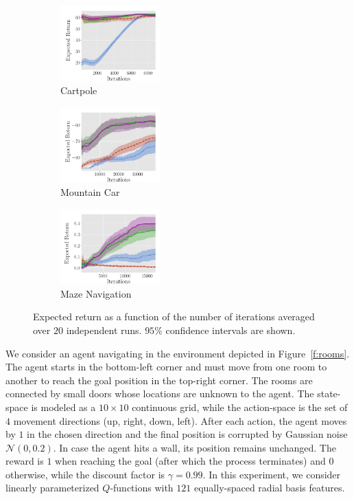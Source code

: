 \documentclass{article}
\begin{document}
\begin{figure}[t]
	\begin{subfigure}[b]{0.32\textwidth}
    \includegraphics[trim=0.0cm 0cm 1.2cm 1.3cm,clip=true,height=2.9cm]{images/cartpole/lrev.pdf}
    \caption{Cartpole}\label{f:cartpole}
  \end{subfigure}
    \begin{subfigure}[b]{0.32\textwidth}
    \includegraphics[trim=0.0cm 0cm 1.2cm 1.3cm,clip=true,height=2.9cm]{images/mountaincar/lrev.pdf}
    \caption{Mountain Car}\label{f:mountaincar}
  \end{subfigure}
    \begin{subfigure}[b]{0.32\textwidth}
    \includegraphics[trim=0.0cm 0cm 1.2cm 1.3cm,clip=true,height=2.9cm]{images/maze/lrev_main.pdf}
    \caption{Maze Navigation}\label{f:maze_results}
  \end{subfigure}
  \caption{Expected return as a function of the number of iterations averaged over $20$ independent runs. $95\%$ confidence intervals are shown.}
  \label{fig:ccmazeplots}
  \label{fig:dipfdbsgraphplots}
\end{figure}
We consider an agent navigating in the environment depicted in Figure~\ref{f:rooms}. The agent starts in the bottom-left corner and must move from one room to another to reach the goal position in the top-right corner. The rooms are connected by small doors whose locations are unknown to the agent. The state-space is modeled as a $10 \times 10$ continuous grid, while the action-space is the set of $4$ movement directions (up, right, down, left). After each action, the agent moves by $1$ in the chosen direction and the final position is corrupted by Gaussian noise $\mathcal{N}(0,0.2)$. In case the agent hits a wall, its position remains unchanged. The reward is $1$ when reaching the goal (after which the process terminates) and $0$ otherwise, while the discount factor is $\gamma = 0.99$. In this experiment, we consider linearly parameterized $Q$-functions with $121$ equally-spaced radial basis features.\\
\end{document}
